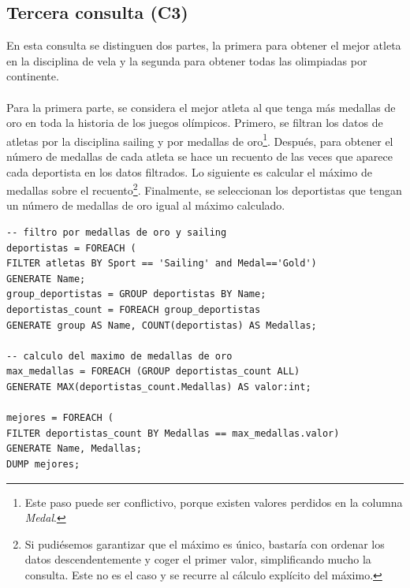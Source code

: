 \subsection*{Tercera consulta (C3)}
En esta consulta se distinguen dos partes, la primera para obtener el mejor atleta en la disciplina de vela y la segunda para obtener todas las olimpiadas por continente.\\\\
Para la primera parte, se considera el mejor atleta al que tenga más medallas de oro en toda la historia de los juegos olímpicos. Primero, se filtran los datos de atletas por la  disciplina sailing y por medallas de oro\footnote{Este paso puede ser conflictivo, porque existen valores perdidos en la columna \textit{Medal}.}. Después, para obtener el número de medallas de cada atleta se hace un recuento de las veces que aparece cada deportista en los datos filtrados. Lo siguiente es calcular el máximo de medallas sobre el recuento\footnote{Si pudiésemos garantizar que el máximo es único, bastaría con ordenar los datos descendentemente y coger el primer valor, simplificando mucho la consulta. Este no es el caso y se recurre al cálculo explícito del máximo.}. Finalmente, se seleccionan los deportistas que tengan un número de medallas de oro igual al máximo calculado.
\begin{lstlisting}[style=base,caption={C3 para el mejor atleta Sailing en Pig}, label={pig_C3_sailing}]
-- filtro por medallas de oro y sailing	
deportistas = FOREACH (
FILTER atletas BY Sport == 'Sailing' and Medal=='Gold') 
GENERATE Name;
group_deportistas = GROUP deportistas BY Name;
deportistas_count = FOREACH group_deportistas 
GENERATE group AS Name, COUNT(deportistas) AS Medallas;

-- calculo del maximo de medallas de oro
max_medallas = FOREACH (GROUP deportistas_count ALL)
GENERATE MAX(deportistas_count.Medallas) AS valor:int;

mejores = FOREACH (
FILTER deportistas_count BY Medallas == max_medallas.valor)
GENERATE Name, Medallas;
DUMP mejores;	
\end{lstlisting}

